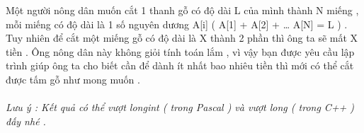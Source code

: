 Một người nông dân muốn cắt 1 thanh gỗ có độ dài L của mình thành N miếng , mỗi miếng có độ dài là 1 số nguyên dương A[i] ( A[1] + A[2] + … A[N] = L ) . Tuy nhiên để cắt một miếng gỗ có độ dài là X thành 2 phần thì ông ta sẽ mất X tiền . Ông nông dân này không giỏi tính toán lắm , vì vậy bạn được yêu cầu lập trình giúp ông ta cho biết cần để dành ít nhất bao nhiêu tiền thì mới có thể cắt được tấm gỗ như mong muốn .   
\\
\\\textit{    Lưu ý : Kết quả có thể vượt         longint        ( trong Pascal ) và vượt         long        ( trong C++ ) đấy nhé .   }